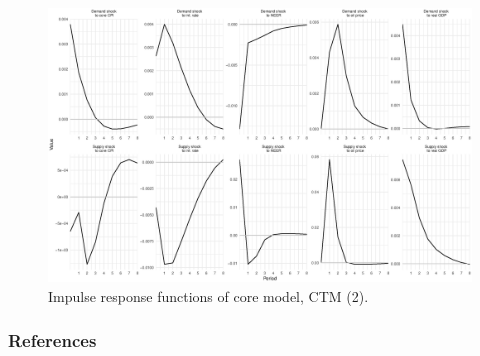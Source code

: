 \documentclass{beamer}
\begin{document}
\begin{frame}[noframenumbering]
	\begin{figure}[h!]
		\centering
		\includegraphics[width=1\linewidth]{../Text/figures/irf_core_2}
		\caption[]{Impulse response functions of core model, CTM (2).}
		\label{fig:irf_core_2}
	\end{figure}
\end{frame}

\begin{frame}
	\frametitle{References}
	\label{references}
	\tiny{
		\printbibliography[heading=none]}
\end{frame}
\end{document}
